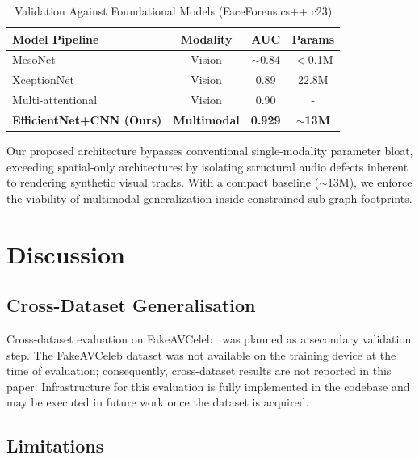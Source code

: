 \documentclass[conference]{IEEEtran}
\begin{document}
\begin{table}[t]
  \centering
  \caption{Validation Against Foundational Models (FaceForensics++ c23)}
  \label{tab:sota}
  \begin{tabular}{lccc}
    \toprule
    \textbf{Model Pipeline} & \textbf{Modality} & \textbf{AUC} & \textbf{Params} \\
    \midrule
    MesoNet~\cite{afchar2018mesonet} & Vision & $\sim$0.84 & $<$0.1M \\
    XceptionNet~\cite{rossler2019faceforensics,chollet2017xception} & Vision & 0.89 & 22.8M \\
    Multi-attentional~\cite{zhao2021multi} & Vision & 0.90 & - \\
    \textbf{EfficientNet+CNN (Ours)} & \textbf{Multimodal} & \textbf{0.929} & \textbf{$\sim$13M} \\
    \bottomrule
  \end{tabular}
\end{table}

Our proposed architecture bypasses conventional single-modality parameter bloat, exceeding spatial-only architectures by isolating structural audio defects inherent to rendering synthetic visual tracks. With a compact baseline ($\sim$13M), we enforce the viability of multimodal generalization inside constrained sub-graph footprints.

\section{Discussion}
\label{sec:discussion}

\subsection{Cross-Dataset Generalisation}
\label{sec:cross_dataset}

Cross-dataset evaluation on FakeAVCeleb~\cite{fakeavceleb2022} was planned as a 
secondary validation step. The FakeAVCeleb dataset was not available on the training 
device at the time of evaluation; consequently, cross-dataset results are not reported 
in this paper. Infrastructure for this evaluation is fully implemented in the codebase 
and may be executed in future work once the dataset is acquired.

\subsection{Limitations}
\label{sec:limitations}
\end{document}
